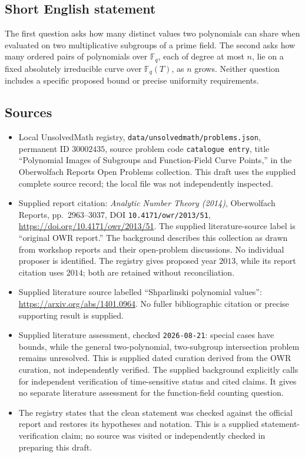 \documentclass[11pt]{article}
\begin{document}
\subsection{Short English statement}
The first question asks how many distinct values two polynomials can share when evaluated on two multiplicative subgroups of a prime field. The second asks how many ordered pairs of polynomials over \(\mathbb F_q\), each of degree at most \(n\), lie on a fixed absolutely irreducible curve over \(\mathbb F_q(T)\), as \(n\) grows. Neither question includes a specific proposed bound or precise uniformity requirements.
\subsection{Sources}
\begin{itemize}
\item Local UnsolvedMath registry, \texttt{data/unsolvedmath/problems.json}, permanent ID \(30002435\), source problem code \texttt{catalogue entry}, title ``Polynomial Images of Subgroups and Function-Field Curve Points,'' in the Oberwolfach Reports Open Problems collection. This draft uses the supplied complete source record; the local file was not independently inspected.
\item Supplied report citation: \emph{Analytic Number Theory (2014)}, Oberwolfach Reports, pp.~2963--3037, DOI \texttt{10.4171/owr/2013/51}, \url{https://doi.org/10.4171/owr/2013/51}. The supplied literature-source label is ``original OWR report.'' The background describes this collection as drawn from workshop reports and their open-problem discussions. No individual proposer is identified. The registry gives proposed year \(2013\), while its report citation uses \(2014\); both are retained without reconciliation.
\item Supplied literature source labelled ``Shparlinski polynomial values'': \url{https://arxiv.org/abs/1401.0964}. No fuller bibliographic citation or precise supporting result is supplied.
\item Supplied literature assessment, checked \texttt{2026-08-21}: special cases have bounds, while the general two-polynomial, two-subgroup intersection problem remains unresolved. This is supplied dated curation derived from the OWR curation, not independently verified. The supplied background explicitly calls for independent verification of time-sensitive status and cited claims. It gives no separate literature assessment for the function-field counting question.
\item The registry states that the clean statement was checked against the official report and restores its hypotheses and notation. This is a supplied statement-verification claim; no source was visited or independently checked in preparing this draft.
\end{itemize}
\end{document}
